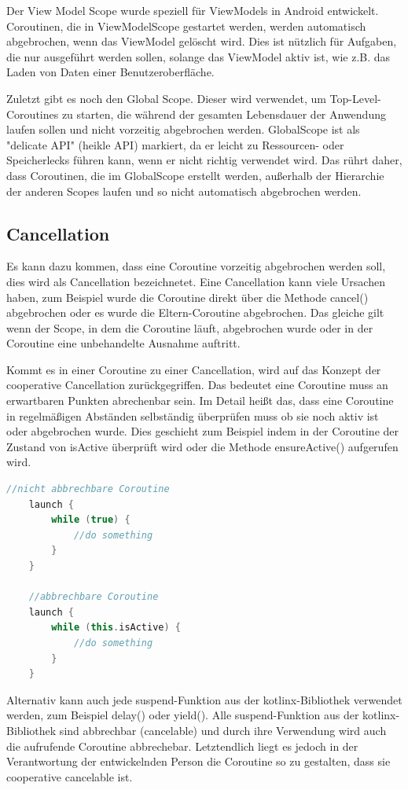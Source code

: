 \documentclass[fontsize=12pt,paper=a4,twoside=semi,parskip=half-,headsepline,headinclude]{scrreprt}
\begin{document}
Der View Model Scope wurde speziell für ViewModels in Android entwickelt. Coroutinen, die in ViewModelScope gestartet werden, werden automatisch abgebrochen, wenn das ViewModel gelöscht wird. Dies ist nützlich für Aufgaben, die nur ausgeführt werden sollen, solange das ViewModel aktiv ist, wie z.B. das Laden von Daten einer Benutzeroberfläche.

Zuletzt gibt es noch den Global Scope. Dieser wird verwendet, um Top-Level-Coroutines zu starten, die während der gesamten Lebensdauer der Anwendung laufen sollen und nicht vorzeitig abgebrochen werden. GlobalScope ist als "delicate API" (heikle API) markiert, da er leicht zu Ressourcen- oder Speicherlecks führen kann, wenn er nicht richtig verwendet wird. Das rührt daher, dass Coroutinen, die im GlobalScope erstellt werden, außerhalb der Hierarchie der anderen Scopes laufen und so nicht automatisch abgebrochen werden.

\subsection{Cancellation}

Es kann dazu kommen, dass eine Coroutine vorzeitig abgebrochen werden soll, dies wird als Cancellation bezeichnetet. Eine Cancellation kann viele Ursachen haben, zum Beispiel wurde die Coroutine direkt über die Methode cancel() abgebrochen oder es wurde die Eltern-Coroutine abgebrochen. Das gleiche gilt wenn der Scope, in dem die Coroutine läuft, abgebrochen wurde oder in der Coroutine eine unbehandelte Ausnahme auftritt.

Kommt es in einer Coroutine zu einer Cancellation, wird auf das Konzept der cooperative Cancellation zurückgegriffen. Das bedeutet eine Coroutine muss an erwartbaren Punkten abrechenbar sein. Im Detail heißt das, dass eine Coroutine in regelmäßigen Abständen selbständig überprüfen muss ob sie noch aktiv ist oder abgebrochen wurde. Dies geschieht zum Beispiel indem in der Coroutine der Zustand von isActive überprüft wird oder die Methode ensureActive() aufgerufen wird.

\begin{lstlisting}[language=Kotlin]
    //nicht abbrechbare Coroutine
	launch {
		while (true) {
			//do something
		}
	}

	//abbrechbare Coroutine
	launch {
		while (this.isActive) {
			//do something
		}
	}
\end{lstlisting}

Alternativ kann auch jede suspend-Funktion aus der kotlinx-Bibliothek verwendet werden, zum Beispiel delay() oder yield(). Alle suspend-Funktion aus der kotlinx-Bibliothek sind abbrechbar (cancelable) und  durch ihre Verwendung wird auch die aufrufende Coroutine abbrechebar. Letztendlich liegt es jedoch in der Verantwortung der entwickelnden Person die Coroutine so zu gestalten, dass sie cooperative cancelable ist.
\end{document}
